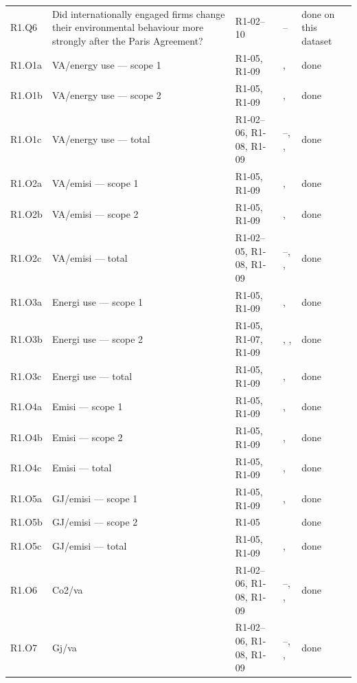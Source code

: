 \begin{longtable}{@{}>{\raggedright\arraybackslash}p{1.2cm}>{\raggedright\arraybackslash}p{7.0cm}>{\raggedright\arraybackslash}p{3.4cm}>{\raggedright\arraybackslash}p{1.9cm}>{\raggedright\arraybackslash}p{2.1cm}@{}}
R1.Q6 & Did internationally engaged firms change their environmental behaviour more strongly after the Paris Agreement? & R1-02--10 & \pageref{ex:R1-02}--\pageref{ex:R1-10} & done on this dataset\\
R1.O1a & VA/energy use --- scope 1 & R1-05, R1-09 & \pageref{ex:R1-05}, \pageref{ex:R1-09} & done\\
R1.O1b & VA/energy use --- scope 2 & R1-05, R1-09 & \pageref{ex:R1-05}, \pageref{ex:R1-09} & done\\
R1.O1c & VA/energy use --- total & R1-02--06, R1-08, R1-09 & \pageref{ex:R1-02}--\pageref{ex:R1-06}, \pageref{ex:R1-08}, \pageref{ex:R1-09} & done\\
R1.O2a & VA/emisi --- scope 1 & R1-05, R1-09 & \pageref{ex:R1-05}, \pageref{ex:R1-09} & done\\
R1.O2b & VA/emisi --- scope 2 & R1-05, R1-09 & \pageref{ex:R1-05}, \pageref{ex:R1-09} & done\\
R1.O2c & VA/emisi --- total & R1-02--05, R1-08, R1-09 & \pageref{ex:R1-02}--\pageref{ex:R1-05}, \pageref{ex:R1-08}, \pageref{ex:R1-09} & done\\
R1.O3a & Energi use --- scope 1 & R1-05, R1-09 & \pageref{ex:R1-05}, \pageref{ex:R1-09} & done\\
R1.O3b & Energi use --- scope 2 & R1-05, R1-07, R1-09 & \pageref{ex:R1-05}, \pageref{ex:R1-07}, \pageref{ex:R1-09} & done\\
R1.O3c & Energi use --- total & R1-05, R1-09 & \pageref{ex:R1-05}, \pageref{ex:R1-09} & done\\
R1.O4a & Emisi --- scope 1 & R1-05, R1-09 & \pageref{ex:R1-05}, \pageref{ex:R1-09} & done\\
R1.O4b & Emisi --- scope 2 & R1-05, R1-09 & \pageref{ex:R1-05}, \pageref{ex:R1-09} & done\\
R1.O4c & Emisi --- total & R1-05, R1-09 & \pageref{ex:R1-05}, \pageref{ex:R1-09} & done\\
R1.O5a & GJ/emisi --- scope 1 & R1-05, R1-09 & \pageref{ex:R1-05}, \pageref{ex:R1-09} & done\\
R1.O5b & GJ/emisi --- scope 2 & R1-05 & \pageref{ex:R1-05} & done\\
R1.O5c & GJ/emisi --- total & R1-05, R1-09 & \pageref{ex:R1-05}, \pageref{ex:R1-09} & done\\
R1.O6 & Co2/va & R1-02--06, R1-08, R1-09 & \pageref{ex:R1-02}--\pageref{ex:R1-06}, \pageref{ex:R1-08}, \pageref{ex:R1-09} & done\\
R1.O7 & Gj/va & R1-02--06, R1-08, R1-09 & \pageref{ex:R1-02}--\pageref{ex:R1-06}, \pageref{ex:R1-08}, \pageref{ex:R1-09} & done\\

\end{longtable}
